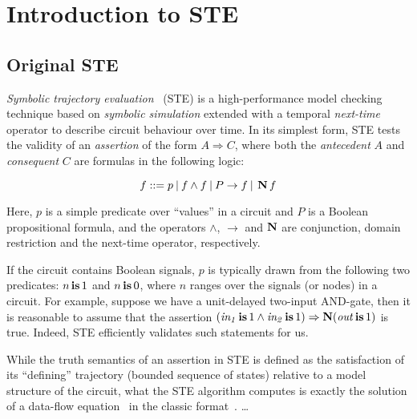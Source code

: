 \section{Introduction to STE}

\subsection{Original STE}

\textit{Symbolic trajectory evaluation}~\cite{seger1995} (STE) is a high-performance model checking technique based on \textit{symbolic simulation} extended with a temporal \textit{next-time} operator to describe circuit behaviour over time. In its simplest form, STE tests the validity of an \textit{assertion} of the form $A \Rightarrow C$, where both the \textit{antecedent} $A$ and \textit{consequent} $C$ are formulas in the following logic:

\begin{equation*}
f ::= p \: | \: f \wedge f \: | \: P \rightarrow f \: | \: \operatorname{\textbf{N}} f
\end{equation*}

\noindent Here, $p$ is a simple predicate over ``values'' in a circuit and $P$ is a Boolean propositional formula, and the operators $\wedge$, $\rightarrow$ and $\operatorname{\textbf{N}}$ are conjunction, domain restriction and the next-time operator, respectively.

If the circuit contains Boolean signals, $p$ is typically drawn from the following two predicates: $n \operatorname{\mathbin{\textbf{is}}} 1$ and $n \operatorname{\mathbin{\textbf{is}}} 0$, where $n$ ranges over the signals (or nodes) in a circuit. For example, suppose we have a unit-delayed two-input AND-gate, then it is reasonable to assume that the assertion $(\mathit{in_{1}} \operatorname{\mathbin{\textbf{is}}} 1 \wedge \mathit{in_{2}} \operatorname{\mathbin{\textbf{is}}} 1) \Rightarrow \operatorname{\textbf{N}} (\mathit{out} \operatorname{\mathbin{\textbf{is}}} 1)$ is true. Indeed, STE efficiently validates such statements for us.

While the truth semantics of an assertion in STE is defined as the satisfaction of its ``defining'' trajectory (bounded sequence of states) relative to a model structure of the circuit, what the STE algorithm computes is exactly the solution of a data-flow equation~\cite{chou1999} in the classic format~\cite{muchnick1997}. \dots




